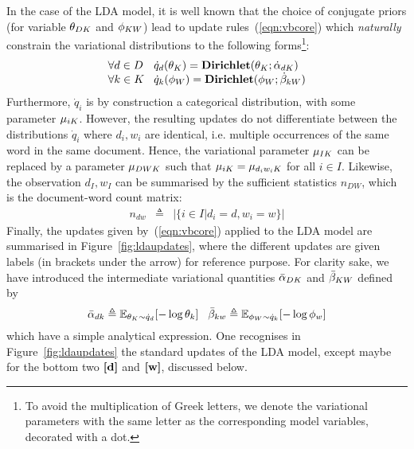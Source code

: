 In the case of the LDA model, it is well known that the choice of conjugate priors (for variable $\theta_{DK}$ and $\phi_{KW}$) lead to update rules~(\ref{eqn:vbcore}) which {\em naturally} constrain the variational distributions to the following forms\footnote{To avoid the multiplication of Greek letters, we denote the variational parameters with the same letter as the corresponding model variables, decorated with a dot.}:
\[
\begin{array}{l@{\hspace{.3cm}}l}
\forall d\in D& \dot{q}_d(\vmDK_K) = \mathbf{Dirichlet}(\vmDK_K;\vvmDK_{dK}) \\
\forall k\in K& \dot{q}_k(\vmKW_W) = \mathbf{Dirichlet}(\vmKW_W;\vvmKW_{kW})
\end{array}
\]
Furthermore, $\dot{q}_i$ is by construction a categorical distribution, with some parameter $\mu_{iK}$. However, the resulting updates do not differentiate between the distributions $\dot{q}_i$ where $d_i,w_i$ are identical, i.e. multiple occurrences of the same word in the same document. Hence, the variational parameter $\mu_{IK}$ can be replaced by a parameter $\mu_{DWK}$ such that $\mu_{iK}=\mu_{d_iw_iK}$ for all $i\in I$. Likewise, the observation $d_I,w_I$ can be summarised by the sufficient statistics $n_{DW}$, which is the document-word count matrix:
\begin{eqnarray*}
n_{dw} & \triangleq & |\{i\in I|d_i=d,w_i=w\}|
\end{eqnarray*}
Finally, the updates given by~(\ref{eqn:vbcore}) applied to the LDA model are summarised in Figure~\ref{fig:ldaupdates}, where the different updates are given labels (in brackets under the arrow) for reference purpose. For clarity sake, we have introduced the intermediate variational quantities $\bar{\alpha}_{DK}$ and $\bar{\beta}_{KW}$ defined by
\[
\bar{\alpha}_{dk}\triangleq\mathbb{E}_{\theta_K\sim\dot{q}_d}[-\log\theta_k]
\hspace{.3cm}
\bar{\beta}_{kw}\triangleq\mathbb{E}_{\phi_W\sim\dot{q}_k}[-\log\phi_w]
\]
which have a simple analytical expression. One recognises in Figure~\ref{fig:ldaupdates} the standard updates of the LDA model, except maybe for the bottom two $\textbf{[d]}$ and $\textbf{[w]}$, discussed below.
